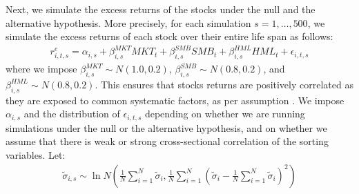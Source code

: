 Next, we simulate the excess returns of the stocks under the null and the alternative hypothesis. More precisely, for each simulation $s=1, \dots, 500$, we simulate the excess returns of each stock over their entire life span as follows:
\begin{align*}
    r_{i,t,s}^e = \alpha_{i,s} + \beta_{i,s}^{MKT} MKT_t + \beta_{i,s}^{SMB} SMB_t + \beta_{i,s}^{HML} HML_t + \epsilon_{i,t,s}
\end{align*}
where we impose $\beta_{i,s}^{MKT} \sim N(1.0, 0.2)$, $\beta_{i,s}^{SMB} \sim N(0.8, 0.2)$, and $\beta_{i,s}^{HML} \sim N(0.8, 0.2)$. This ensures that stocks returns are positively correlated as they are exposed to common systematic factors, as per assumption . We impose $\alpha_{i,s}$ and the distribution of $\epsilon_{i,t,s}$ depending on whether we are running simulations under the null or the alternative hypothesis, and on whether we assume that there is weak or strong cross-sectional correlation of the sorting variables. Let:
\begin{align*}
    \widetilde{\sigma}_{i,s} \sim \ln N \left( \frac{1}{N} \sum_{i=1}^N \widetilde{\sigma}_i, \frac{1}{N} \sum_{i=1}^N \left( \widetilde{\sigma}_i - \frac{1}{N} \sum_{i=1}^N \widetilde{\sigma}_i \right)^2 \right)
\end{align*}
